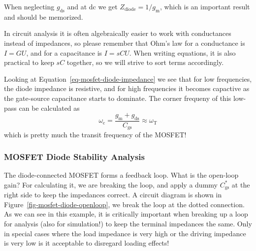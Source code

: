 \documentclass[
  a4paper,
  DIV=11,
  numbers=noendperiod]{scrartcl}
\begin{document}
When neglecting \(g_\mathrm{ds}\) and at dc we get
\(Z_\mathrm{diode} = 1 / g_\mathrm{m}\), which is an important result
and should be memorized.

\begin{tcolorbox}[enhanced jigsaw, colframe=quarto-callout-important-color-frame, opacityback=0, breakable, toptitle=1mm, left=2mm, rightrule=.15mm, titlerule=0mm, arc=.35mm, toprule=.15mm, bottomrule=.15mm, colbacktitle=quarto-callout-important-color!10!white, bottomtitle=1mm, colback=white, title=\textcolor{quarto-callout-important-color}{\faExclamation}\hspace{0.5em}{Important}, coltitle=black, leftrule=.75mm, opacitybacktitle=0.6]

In circuit analysis it is often algebraically easier to work with
conductances instead of impedances, so please remember that Ohm's law
for a conductance is \(I = G U\), and for a capacitance is
\(I = s C U\). When writing equations, it is also practical to keep
\(s C\) together, so we will strive to sort terms accordingly.

\end{tcolorbox}

Looking at Equation~\ref{eq-mosfet-diode-impedance} we see that for low
frequencies, the diode impedance is resistive, and for high frequencies
it becomes capactive as the gate-source capacitance starts to dominate.
The corner frequeny of this low-pass can be calculated as \[
\omega_\mathrm{c} = \frac{g_\mathrm{m}+ g_\mathrm{ds}}{C_\mathrm{gs}} \approx \omega_\mathrm{T}
\] which is pretty much the transit frequency of the MOSFET!

\subsubsection{MOSFET Diode Stability
Analysis}\label{mosfet-diode-stability-analysis}

The diode-connected MOSFET forms a feedback loop. What is the open-loop
gain? For calculating it, we are breaking the loop, and apply a dummy
\(C_\mathrm{gs}^{*}\) at the right side to keep the impedances correct.
A circuit diagram is shown in Figure~\ref{fig-mosfet-diode-openloop}, we
break the loop at the dotted connection. As we can see in this example,
it is critically important when breaking up a loop for analysis (also
for simulation!) to keep the terminal impedances the same. Only in
special cases where the load impedance is very high or the driving
impedance is very low is it acceptable to disregard loading effects!
\end{document}
